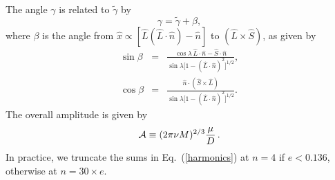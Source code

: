 \documentclass[12pt]{iopart}
\def\be{\begin{equation}}
\def\ee{\end{equation}}
\begin{document}
The angle $\gamma$ is related to $\tilde \gamma$ by
\be
\label{beta}
\gamma = \tilde\gamma + \beta,
\ee
where $\beta$ is the angle from $\hat x \propto [\hat L(\hat L \cdot \hat n) - \hat n] $ to $(\hat L \times \hat S)$, as given by
\begin{eqnarray}\label{sinbeta}
\sin\beta &=& \frac{\cos\lambda\, \hat L\cdot\hat n -\hat S\cdot \hat n }
{\sin\lambda\bigl[1 - (\hat L\cdot\hat n)^2\bigr]^{1/2}}, \nonumber \\
\cos\beta &=& \frac{\hat n \cdot (\hat S \times \hat L)}
{\sin\lambda\bigl[1 - (\hat L\cdot\hat n)^2\bigr]^{1/2} }.
\end{eqnarray}
%
The overall amplitude is given by
\begin{equation} \label{calA}
{\cal A}\equiv (2\pi \nu M)^{2/3}\frac{\mu}{D}\,.
\end{equation}
In practice, we truncate the sums in Eq.~(\ref{harmonics}) at $n=4$ if $e < 0.136$, otherwise at $n = 30\times e$.
\end{document}
